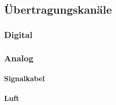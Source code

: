 \subsection{Übertragungskanäle}

\subsubsection{Digital}

\subsubsection{Analog}

\paragraph{Signalkabel}

\paragraph{Luft}






